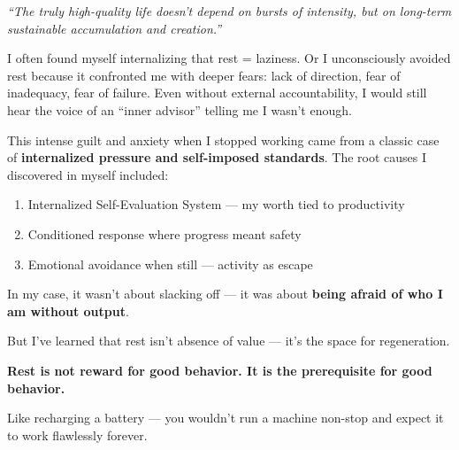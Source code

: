 \documentclass[11pt,a4paper]{article}
\begin{document}
\begin{tcolorbox}[colback=yellow!5,colframe=orange!60,title={Personal Reflection: Why I Struggled with Rest}]
\textit{``The truly high-quality life doesn't depend on bursts of intensity, but on long-term sustainable accumulation and creation.''}

\vspace{0.3em}
I often found myself internalizing that rest = laziness. Or I unconsciously avoided rest because it confronted me with deeper fears: lack of direction, fear of inadequacy, fear of failure. Even without external accountability, I would still hear the voice of an ``inner advisor'' telling me I wasn't enough.

\vspace{0.3em}
This intense guilt and anxiety when I stopped working came from a classic case of \textbf{internalized pressure and self-imposed standards}. The root causes I discovered in myself included:

\begin{enumerate}[leftmargin=1.5em]
    \item Internalized Self-Evaluation System — my worth tied to productivity
    \item Conditioned response where progress meant safety
    \item Emotional avoidance when still — activity as escape
\end{enumerate}

In my case, it wasn't about slacking off — it was about \textbf{being afraid of who I am without output}.

\vspace{0.5em}
But I've learned that rest isn't absence of value — it's the space for regeneration.

\vspace{0.5em}
\begin{center}
\colorbox{yellow!20}{\parbox{0.9\textwidth}{\centering\textbf{Rest is not reward for good behavior. It is the prerequisite for good behavior.}}}
\end{center}
\vspace{0.5em}

Like recharging a battery — you wouldn't run a machine non-stop and expect it to work flawlessly forever.
\end{tcolorbox}
\end{document}
